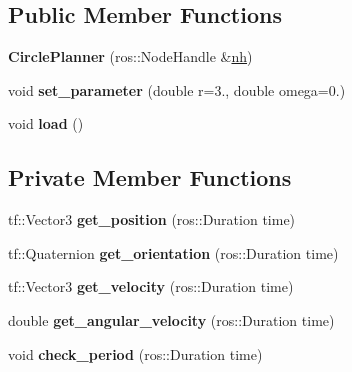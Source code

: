 \subsection*{Public Member Functions}
\begin{DoxyCompactItemize}
\item 
{\bfseries Circle\+Planner} (ros\+::\+Node\+Handle \&\hyperlink{classPlanner_a9714d036f444a07ce90be8d135b9a40c}{nh})\hypertarget{classCirclePlanner_a33a27f97f5a1300d43c80b519fdfb3ef}{}\label{classCirclePlanner_a33a27f97f5a1300d43c80b519fdfb3ef}

\item 
void {\bfseries set\+\_\+parameter} (double r=3., double omega=0.)\hypertarget{classCirclePlanner_a21fef783d5f2252fd1b53d93e869fc65}{}\label{classCirclePlanner_a21fef783d5f2252fd1b53d93e869fc65}

\item 
void {\bfseries load} ()\hypertarget{classCirclePlanner_a1c14f6ed36cbd32d39d60ed312a65de8}{}\label{classCirclePlanner_a1c14f6ed36cbd32d39d60ed312a65de8}

\end{DoxyCompactItemize}
\subsection*{Private Member Functions}
\begin{DoxyCompactItemize}
\item 
tf\+::\+Vector3 {\bfseries get\+\_\+position} (ros\+::\+Duration time)\hypertarget{classCirclePlanner_a1d6cdbec03a259af77937f0274dde5d9}{}\label{classCirclePlanner_a1d6cdbec03a259af77937f0274dde5d9}

\item 
tf\+::\+Quaternion {\bfseries get\+\_\+orientation} (ros\+::\+Duration time)\hypertarget{classCirclePlanner_a4e774b6cbc87a3dfa718df5594a0adbf}{}\label{classCirclePlanner_a4e774b6cbc87a3dfa718df5594a0adbf}

\item 
tf\+::\+Vector3 {\bfseries get\+\_\+velocity} (ros\+::\+Duration time)\hypertarget{classCirclePlanner_a5184277b2e174515140514fdec37ba29}{}\label{classCirclePlanner_a5184277b2e174515140514fdec37ba29}

\item 
double {\bfseries get\+\_\+angular\+\_\+velocity} (ros\+::\+Duration time)\hypertarget{classCirclePlanner_afa7c8502da92a63c78711ca92e73fe2b}{}\label{classCirclePlanner_afa7c8502da92a63c78711ca92e73fe2b}

\item 
void {\bfseries check\+\_\+period} (ros\+::\+Duration time)\hypertarget{classCirclePlanner_ab981788d76132e3f03ebedeb128d703a}{}\label{classCirclePlanner_ab981788d76132e3f03ebedeb128d703a}

\end{DoxyCompactItemize}
